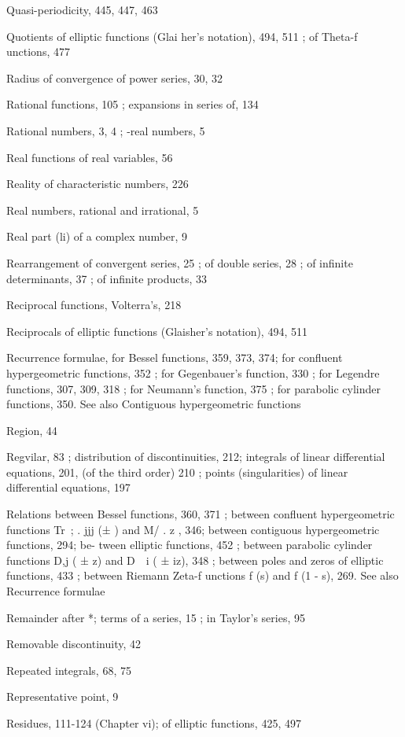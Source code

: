 Quasi-periodicity, 445, 447, 463

Quotients of elliptic functions (Glai her's notation), 494, 511 ; of Theta-f unctions, 477

Radius of convergence of power series, 30, 32

Rational functions, 105 ; expansions in series of, 134

Rational numbers, 3, 4 ; -real numbers, 5

Real functions of real variables, 56

Reality of characteristic numbers, 226

Real numbers, rational and irrational, 5

Real part (li) of a complex number, 9

Rearrangement of convergent series, 25 ; of double series, 28 ; of infinite determinants, 37 ; of
infinite products, 33

Reciprocal functions, Volterra's, 218

Reciprocals of elliptic functions (Glaisher's notation), 494, 511

Recurrence formulae, for Bessel functions, 359, 373, 374; for confluent hypergeometric functions,
352 ; for Gegenbauer's function, 330 ; for Legendre functions, 307, 309, 318 ; for Neumann's
function, 375 ; for parabolic cylinder functions, 350. See also Contiguous hypergeometric
functions

Region, 44

Regvilar, 83 ; distribution of discontinuities, 212; integrals of linear differential equations, 201,
(of the third order) 210 ; points (singularities) of linear differential equations, 197

Relations between Bessel functions, 360, 371 ; between confluent hypergeometric functions
Tr\ ; . jjj (± ) and M/ .    z , 346; between contiguous hypergeometric functions, 294; be-
tween elliptic functions, 452 ; between parabolic cylinder functions D,j ( ± z) and D\  \ i ( ± iz),
348 ; between poles and zeros of elliptic functions, 433 ; between Riemann Zeta-f unctions
f (s) and f (1 - s), 269. See also Recurrence formulae

Remainder after *; terms of a series, 15 ; in Taylor's series, 95

Removable discontinuity, 42

Repeated integrals, 68, 75

Representative point, 9

Residues, 111-124 (Chapter vi); of elliptic functions,
425, 497

